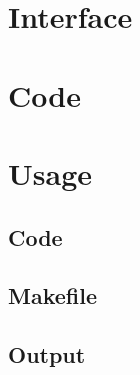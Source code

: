 \documentclass[12pt, a4paper]{article}
\begin{document}
\section{Interface}

\begin{scriptsize}
\begin{ttfamily}

\end{ttfamily}
\end{scriptsize}

\section{Code}

\begin{scriptsize}
\begin{ttfamily}

\end{ttfamily}
\end{scriptsize}

\section{Usage}

\subsection{Code}

\begin{scriptsize}
\begin{ttfamily}

\end{ttfamily}
\end{scriptsize}

\subsection{Makefile}

\begin{scriptsize}
\begin{ttfamily}

\end{ttfamily}
\end{scriptsize}

\subsection{Output}
\end{document}
